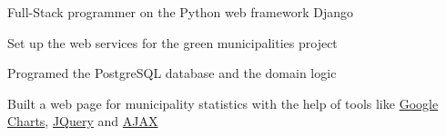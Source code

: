 \documentclass[]{joaosoares-resume}
\begin{document}
\begin{minipage}[t]{0.60\textwidth}
\begin{tightemize}
\item Full-Stack programmer on the Python web framework Django
\item  Set up the web services for the green municipalities project
\item Programed the PostgreSQL database and the domain logic
\item Built a web page for municipality statistics with the help of tools like \href{https://developers.google.com/chart}{Google Charts}, \href{http://plugins.jquery.com}{JQuery} and  \href{https://api.jquery.com/category/ajax}{AJAX}
\end{tightemize}

\sectionsep

\end{minipage}
\end{document}
